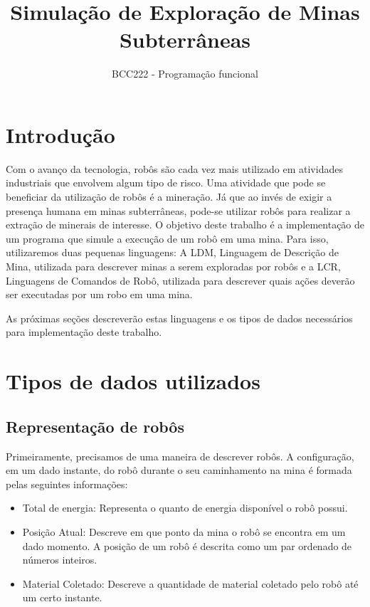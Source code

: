 \documentclass[a4paper]{article}
\author{BCC222 - Programação funcional}
\date{}
\title{Simulação de Exploração de Minas Subterrâneas}
\begin{document}
\maketitle

\section{Introdução}
\label{sec:orge262c58}

Com o avanço da tecnologia, robôs são cada vez mais utilizado em atividades
industriais que envolvem algum tipo de risco. Uma atividade que pode se beneficiar
da utilização de robôs é a mineração. Já que ao invés de exigir a presença humana em
minas subterrâneas, pode-se utilizar robôs para realizar a extração de minerais de
interesse. O objetivo deste trabalho é a implementação de um programa que simule a
execução de um robô em uma mina. Para isso, utilizaremos duas pequenas linguagens:
A LDM, Linguagem de Descrição de Mina, utilizada para descrever minas a serem
exploradas por robôs e a LCR, Linguagens de Comandos de Robô, utilizada para
descrever quais ações deverão ser executadas por um robo em uma mina.

As próximas seções descreverão estas linguagens e os tipos de dados necessários
para implementação deste trabalho.

\section{Tipos de dados utilizados}
\label{sec:org2aa089a}

\subsection{Representação de robôs}
\label{sec:orgfb9631c}

Primeiramente, precisamos de uma maneira de descrever robôs. A configuração, em um
dado instante, do robô durante o seu caminhamento na mina é formada pelas seguintes
informações:

\begin{itemize}
\item Total de energia: Representa o quanto de energia disponível o robô possui.
\item Posição Atual: Descreve em que ponto da mina o robô se encontra em um dado
momento. A posição de um robô é descrita como um par ordenado de números inteiros.
\item Material Coletado: Descreve a quantidade de material coletado pelo robô até
um certo instante.
\end{itemize}
\end{document}
